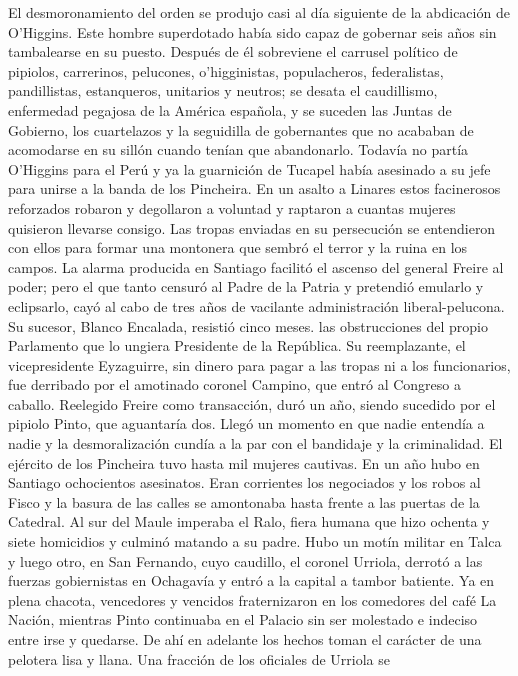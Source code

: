 \documentclass[10pt,twoside,openright]{memoir}
\begin{document}
El desmoronamiento del orden se produjo casi al día siguiente de la
abdicación de O'Higgins. Este hombre superdotado había sido capaz de
gobernar seis años sin tambalearse en su puesto. Después de él
sobreviene el carrusel político de pipiolos, carrerinos, pelucones,
o'higginistas, populacheros, federalistas, pandillistas, estanqueros,
unitarios y neutros; se desata el caudillismo, enfermedad pegajosa de la
América española, y se suceden las Juntas de Gobierno, los cuartelazos y
la seguidilla de gobernantes que no acababan de acomodarse en su sillón
cuando tenían que abandonarlo. Todavía no partía O'Higgins para el Perú
y ya la guarnición de Tucapel había asesinado a su jefe para unirse a la
banda de los Pincheira. En un asalto a Linares estos facinerosos
reforzados robaron y degollaron a voluntad y raptaron a cuantas mujeres
quisieron llevarse consigo. Las tropas enviadas en su persecución se
entendieron con ellos para formar una montonera que sembró el terror y
la ruina en los campos. La alarma producida en Santiago facilitó el
ascenso del general Freire al poder; pero el que tanto censuró al Padre
de la Patria y pretendió emularlo y eclipsarlo, cayó al cabo de tres
años de vacilante administración liberal-pelucona. Su sucesor, Blanco
Encalada, resistió cinco meses. las obstrucciones del propio Parlamento
que lo ungiera Presidente de la República. Su reemplazante, el
vicepresidente Eyzaguirre, sin dinero para pagar a las tropas ni a los
funcionarios, fue derribado por el amotinado coronel Campino, que entró
al Congreso a caballo. Reelegido Freire como transacción, duró un año,
siendo sucedido por el pipiolo Pinto, que aguantaría dos. Llegó un
momento en que nadie entendía a nadie y la desmoralización cundía a la
par con el bandidaje y la criminalidad. El ejército de los Pincheira
tuvo hasta mil mujeres cautivas. En un año hubo en Santiago ochocientos
asesinatos. Eran corrientes los negociados y los robos al Fisco y la
basura de las calles se amontonaba hasta frente a las puertas de la
Catedral. Al sur del Maule imperaba el Ralo, fiera humana que hizo
ochenta y siete homicidios y culminó matando a su padre. Hubo un motín
militar en Talca y luego otro, en San Fernando, cuyo caudillo, el
coronel Urriola, derrotó a las fuerzas gobiernistas en Ochagavía y entró
a la capital a tambor batiente. Ya en plena chacota, vencedores y
vencidos fraternizaron en los comedores del café La Nación, mientras
Pinto continuaba en el Palacio sin ser molestado e indeciso entre irse y
quedarse. De ahí en adelante los hechos toman el carácter de una
pelotera lisa y llana. Una fracción de los oficiales de Urriola se
\end{document}
